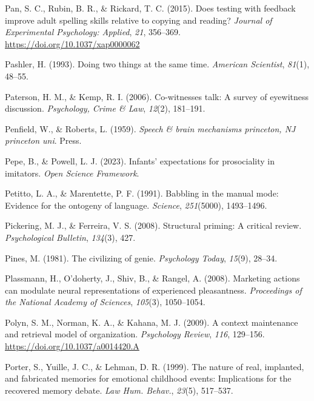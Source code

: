 \documentclass[
]{krantz}
\newlength{\cslhangindent}
\newenvironment{CSLReferences}[2] %
 {\begin{list}{}{%
  \setlength{\itemindent}{0pt}
  \setlength{\leftmargin}{0pt}
  \setlength{\parsep}{0pt}
  \ifodd #1
   \setlength{\leftmargin}{\cslhangindent}
   \setlength{\itemindent}{-1\cslhangindent}
  \fi
  \setlength{\itemsep}{#2\baselineskip}}}
 {\end{list}}
\begin{document}
\begin{CSLReferences}{1}{0}
Pan, S. C., Rubin, B. R., \& Rickard, T. C. (2015). Does testing with feedback improve adult spelling skills relative to copying and reading? \emph{Journal of Experimental Psychology: Applied}, \emph{21}, 356--369. \url{https://doi.org/10.1037/xap0000062}

Pashler, H. (1993). Doing two things at the same time. \emph{American Scientist}, \emph{81}(1), 48--55.

Paterson, H. M., \& Kemp, R. I. (2006). Co-witnesses talk: A survey of eyewitness discussion. \emph{Psychology, Crime \& Law}, \emph{12}(2), 181--191.

Penfield, W., \& Roberts, L. (1959). \emph{Speech \& brain mechanisms princeton, NJ princeton uni}. Press.

Pepe, B., \& Powell, L. J. (2023). Infants' expectations for prosociality in imitators. \emph{Open Science Framework}.

Petitto, L. A., \& Marentette, P. F. (1991). Babbling in the manual mode: Evidence for the ontogeny of language. \emph{Science}, \emph{251}(5000), 1493--1496.

Pickering, M. J., \& Ferreira, V. S. (2008). Structural priming: A critical review. \emph{Psychological Bulletin}, \emph{134}(3), 427.

Pines, M. (1981). The civilizing of genie. \emph{Psychology Today}, \emph{15}(9), 28--34.

Plassmann, H., O'doherty, J., Shiv, B., \& Rangel, A. (2008). Marketing actions can modulate neural representations of experienced pleasantness. \emph{Proceedings of the National Academy of Sciences}, \emph{105}(3), 1050--1054.

Polyn, S. M., Norman, K. A., \& Kahana, M. J. (2009). A context maintenance and retrieval model of organization. \emph{Psychology Review}, \emph{116}, 129--156. \url{https://doi.org/10.1037/a0014420.A}

Porter, S., Yuille, J. C., \& Lehman, D. R. (1999). The nature of real, implanted, and fabricated memories for emotional childhood events: Implications for the recovered memory debate. \emph{Law Hum. Behav.}, \emph{23}(5), 517--537.


\end{CSLReferences}
\end{document}
